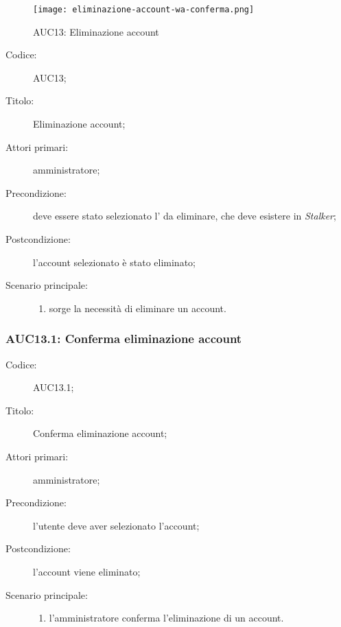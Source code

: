 \documentclass[../../../analisi-dei-requisiti.tex]{subfiles}
\begin{document}
\begin{figure}[H]
  \centering
  \texttt{[image: eliminazione-account-wa-conferma.png]}
  \caption{AUC13: Eliminazione account}%
  \label{fig:AUC13}
\end{figure}

\begin{description}
  \item[Codice:] AUC13;
  \item[Titolo:] Eliminazione account;
  \item[Attori primari:] amministratore;
  \item[Precondizione:] deve essere stato selezionato l' da eliminare, che deve esistere in \emph{Stalker};
  \item[Postcondizione:] l'account selezionato è stato eliminato;
  \item[Scenario principale:]
  \begin{enumerate}
    \item sorge la necessità di eliminare un account.
  \end{enumerate}
\end{description}

\subsubsection{AUC13.1: Conferma eliminazione account}%
\label{subs:AUC13.1}
\begin{description}
  \item[Codice:] AUC13.1;
  \item[Titolo:] Conferma eliminazione account;
  \item[Attori primari:] amministratore;
  \item[Precondizione:] l'utente deve aver selezionato l'account;
  \item[Postcondizione:] l'account viene eliminato;
  \item[Scenario principale:]
  \begin{enumerate}
    \item l'amministratore conferma l'eliminazione di un account.
  \end{enumerate}
\end{description}
\end{document}
